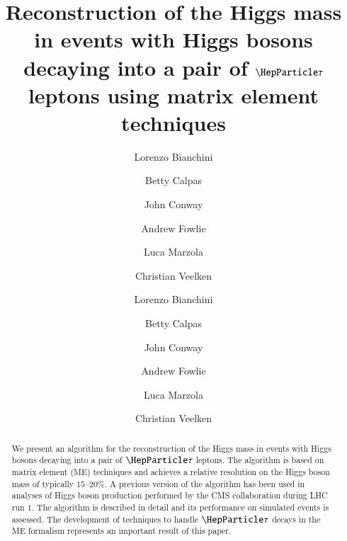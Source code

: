 \documentclass[a4paper,english,11pt]{article}
\begin{document}
\ifx\ver\verPAPER
\begin{frontmatter}
\fi

\title{Reconstruction of the Higgs mass in events with Higgs bosons
  decaying into a pair of $\Pgt$ leptons using matrix element techniques}


\ifx\ver\verPreprint
\author[1]{Lorenzo Bianchini}
\author[2]{Betty Calpas}
\author[3]{John Conway}
\author[2]{Andrew Fowlie}
\author[4]{Luca Marzola}
\author[2]{Christian Veelken}
\fi
\ifx\ver\verPAPER
\author[eth]{Lorenzo Bianchini}
\author[tallinn]{Betty Calpas}
\author[ucd]{John Conway}
\author[tallinn]{Andrew Fowlie}
\author[tartu]{Luca Marzola}
\author[tallinn]{Christian Veelken}
\address[eth]{Institute for Particle Physics, ETH Zurich, 8093 Zurich, Switzerland}
\address[ucd]{Department of Physics, University of California, Davis, CA 95616}
\address[tallinn]{National Institute for Chemical Physics and Biophysics, 10143 Tallinn, Estonia}
\address[tartu]{Institute of Physics, University of Tartu, 51014 Tartu, Estonia}
\fi

\ifx\ver\verPreprint
\maketitle
\fi

\begin{abstract}
We present an algorithm for the reconstruction of the Higgs mass in events with Higgs bosons decaying into a pair of $\Pgt$ leptons.
The algorithm is based on matrix element (ME) techniques and achieves
a relative resolution on the Higgs boson mass of typically $15$--$20\%$.
A previous version of the algorithm has been used in analyses of Higgs
boson production performed by the CMS collaboration during LHC run
$1$.
The algorithm is described in detail and its performance on simulated
events is assessed.
The development of techniques to handle $\Pgt$ decays in the ME
formalism represents an important result of this paper.
\end{abstract}

\ifx\ver\verPAPER
\end{frontmatter}
\fi
\end{document}
